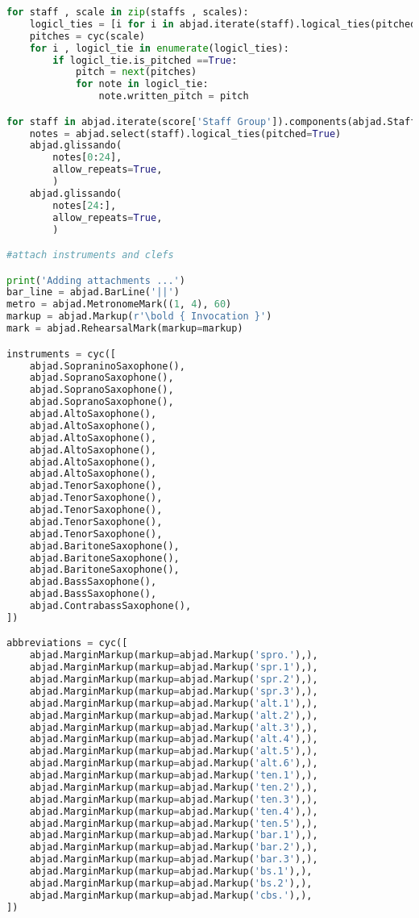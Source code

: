 \begin{lstlisting}[language=Python, caption=Invocation Source Code]
for staff , scale in zip(staffs , scales):
    logicl_ties = [i for i in abjad.iterate(staff).logical_ties(pitched=True)]
    pitches = cyc(scale)
    for i , logicl_tie in enumerate(logicl_ties):
        if logicl_tie.is_pitched ==True:
            pitch = next(pitches)
            for note in logicl_tie:
                note.written_pitch = pitch

for staff in abjad.iterate(score['Staff Group']).components(abjad.Staff):
    notes = abjad.select(staff).logical_ties(pitched=True)
    abjad.glissando(
        notes[0:24],
        allow_repeats=True,
        )
    abjad.glissando(
        notes[24:],
        allow_repeats=True,
        )

#attach instruments and clefs

print('Adding attachments ...')
bar_line = abjad.BarLine('||')
metro = abjad.MetronomeMark((1, 4), 60)
markup = abjad.Markup(r'\bold { Invocation }')
mark = abjad.RehearsalMark(markup=markup)

instruments = cyc([
    abjad.SopraninoSaxophone(),
    abjad.SopranoSaxophone(),
    abjad.SopranoSaxophone(),
    abjad.SopranoSaxophone(),
    abjad.AltoSaxophone(),
    abjad.AltoSaxophone(),
    abjad.AltoSaxophone(),
    abjad.AltoSaxophone(),
    abjad.AltoSaxophone(),
    abjad.AltoSaxophone(),
    abjad.TenorSaxophone(),
    abjad.TenorSaxophone(),
    abjad.TenorSaxophone(),
    abjad.TenorSaxophone(),
    abjad.TenorSaxophone(),
    abjad.BaritoneSaxophone(),
    abjad.BaritoneSaxophone(),
    abjad.BaritoneSaxophone(),
    abjad.BassSaxophone(),
    abjad.BassSaxophone(),
    abjad.ContrabassSaxophone(),
])

abbreviations = cyc([
    abjad.MarginMarkup(markup=abjad.Markup('spro.'),),
    abjad.MarginMarkup(markup=abjad.Markup('spr.1'),),
    abjad.MarginMarkup(markup=abjad.Markup('spr.2'),),
    abjad.MarginMarkup(markup=abjad.Markup('spr.3'),),
    abjad.MarginMarkup(markup=abjad.Markup('alt.1'),),
    abjad.MarginMarkup(markup=abjad.Markup('alt.2'),),
    abjad.MarginMarkup(markup=abjad.Markup('alt.3'),),
    abjad.MarginMarkup(markup=abjad.Markup('alt.4'),),
    abjad.MarginMarkup(markup=abjad.Markup('alt.5'),),
    abjad.MarginMarkup(markup=abjad.Markup('alt.6'),),
    abjad.MarginMarkup(markup=abjad.Markup('ten.1'),),
    abjad.MarginMarkup(markup=abjad.Markup('ten.2'),),
    abjad.MarginMarkup(markup=abjad.Markup('ten.3'),),
    abjad.MarginMarkup(markup=abjad.Markup('ten.4'),),
    abjad.MarginMarkup(markup=abjad.Markup('ten.5'),),
    abjad.MarginMarkup(markup=abjad.Markup('bar.1'),),
    abjad.MarginMarkup(markup=abjad.Markup('bar.2'),),
    abjad.MarginMarkup(markup=abjad.Markup('bar.3'),),
    abjad.MarginMarkup(markup=abjad.Markup('bs.1'),),
    abjad.MarginMarkup(markup=abjad.Markup('bs.2'),),
    abjad.MarginMarkup(markup=abjad.Markup('cbs.'),),
])


\end{lstlisting}
